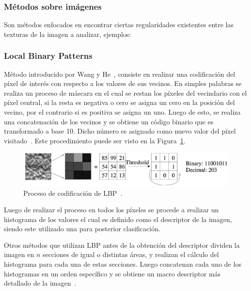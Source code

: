 	\subsubsection{Métodos sobre imágenes}
	\label{sec:met_imagen}
		Son métodos enfocados en encontrar ciertas regularidades existentes entre las texturas de la imagen a analizar, ejemplos:

		\subsubsection{Local Binary Patterns}
		\label{sec:lbp}
		Método introducido por Wang y He~\cite{Wang1990}, consiste en realizar una codificación del píxel de interés con respecto a los valores de sus vecinos. En simples palabras se realiza un proceso de máscara en el cual se restan los píxeles del vecindario con el píxel central, si la resta es negativa o cero se asigna un cero en la posición del vecino, por el contrario si es positiva se asigna un uno. Luego de esto, se realiza una concatenación de los vecinos y se obtiene un código binario que es transformado a base 10. Dicho número es asignado como nuevo valor del píxel visitado~\cite{Ojala1994,Ojala2002,Ahonen2004,Shan2009}. Este procedimiento puede ser visto en la Figura~\ref{art:fig:lbp}.
		
\begin{figure}[tb]
  \centering
   \includegraphics[width=1\textwidth]{Figuras/lbp.pdf}
  \caption{Proceso de codificación de LBP~\cite{Ahonen2006}.}
  \label{art:fig:lbp}
\end{figure}

Luego de realizar el proceso en todos los píxeles se procede a realizar un histograma de los valores el cual es definido como el descriptor de la imagen, siendo este utilizado una para posterior clasificación.

Otros métodos que utilizan LBP antes de la obtención del descriptor dividen la imagen en $n$ secciones de igual o distintas áreas, y realizan el cálculo del histograma para cada una de estas secciones. Luego concatenan cada uno de los histogramas en un orden específico y se obtiene un macro descriptor más detallado de la imagen~\cite{Ahonen2006}.

